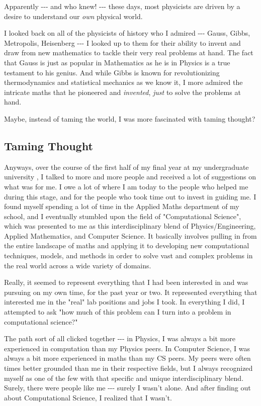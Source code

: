 \documentclass[]{article}
\begin{document}
Apparently -\/-\/- and who knew! -\/-\/- these days, most physicists are driven
by a desire to understand our \emph{own} physical world.

I looked back on all of the physicists of history who I admired -\/-\/- Gauss,
Gibbs, Metropolis, Heisenberg -\/-\/- I looked up to them for their ability to
invent and draw from new mathematics to tackle their very real problems at hand.
The fact that Gauss is just as popular in Mathematics as he is in Physics is a
true testament to his genius. And while Gibbs is known for revolutionizing
thermodynamics and statistical mechanics as we know it, I more admired the
intricate maths that he pioneered and \emph{invented}, \emph{just} to solve the
problems at hand.

Maybe, instead of taming the world, I was more fascinated with taming thought?

\subsection{Taming Thought}

Anyways, over the course of the first half of my final year at my undergraduate
university , I talked to more and more people and received a lot of suggestions
on what was for me. I owe a lot of where I am today to the people who helped me
during this stage, and for the people who took time out to invest in guiding me.
I found myself spending a lot of time in the Applied Maths department of my
school, and I eventually stumbled upon the field of "Computational Science",
which was presented to me as this interdisciplinary blend of
Physics/Engineering, Applied Mathematics, and Computer Science. It basically
involves pulling in from the entire landscape of maths and applying it to
developing new computational techniques, models, and methods in order to solve
vast and complex problems in the real world across a wide variety of domains.

Really, it seemed to represent everything that I had been interested in and was
pursuing on my own time, for the past year or two. It represented everything
that interested me in the "real" lab positions and jobs I took. In everything I
did, I attempted to ask "how much of this problem can I turn into a problem in
computational science?"

The path sort of all clicked together -\/-\/- in Physics, I was always a bit
more experienced in computation than my Physics peers. In Computer Science, I
was always a bit more experienced in maths than my CS peers. My peers were often
times better grounded than me in their respective fields, but I always
recognized myself as one of the few with that specific and unique
interdisciplinary blend. Surely, there were people like me -\/-\/- surely I
wasn't alone. And after finding out about Computational Science, I realized that
I wasn't.
\end{document}
